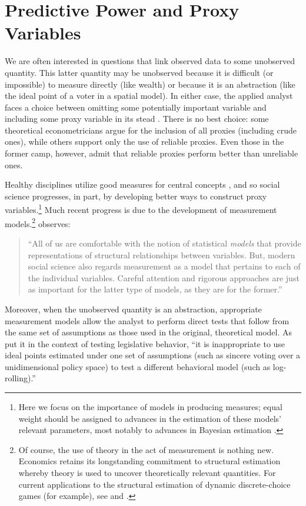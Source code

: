 \section{Predictive Power and Proxy Variables}

We are often interested in questions that link observed data to some unobserved quantity. 
This latter quantity may be unobserved because it is difficult (or impossible) to measure directly (like wealth) or because it is an abstraction (like the ideal point of a voter in a spatial model). 
In either case, the applied analyst faces a choice between omitting some potentially important variable and including some proxy variable in its stead \citep{stahlecker1993}. 
There is no best choice: some theoretical econometricians \citep[e.g.][]{mccallum1972} argue for the inclusion of all proxies (including crude ones), while others \citep[e.g.][]{maddala1977} support only the use of reliable proxies. 
Even those in the former camp, however, admit that reliable proxies perform better than unreliable ones.

Healthy disciplines utilize good measures for central concepts \citep{kuhn1977}, and so social science progresses, in part, by developing better ways to construct proxy variables.\footnote{Here we focus on the importance of models in producing measures; equal weight should be assigned to advances in the estimation of these models' relevant parameters, most notably to advances in Bayesian estimation \citep{jackman2001,martin2002,clinton2004,bafumi2005}.} 
Much recent progress is due to the development of measurement models.\footnote{Of course, the use of theory in the act of measurement is nothing new. 
  Economics retains its longstanding commitment to structural estimation whereby theory is used to uncover theoretically relevant quantities. 
  For current applications to the structural estimation of dynamic discrete-choice games (for example), see \citet{su2012} and \citet{egesdal2013}.} \citet[2]{jacoby2014} observes:
\begin{quote}
  ``All of us are comfortable with the notion of statistical \emph{models} that provide representations of structural relationships between variables.  But, modern social science also regards measurement as a model that pertains to each of the individual variables.  Careful attention and rigorous approaches are just as important for the latter type of models, as they are for the former.''
\end{quote}
Moreover, when the unobserved quantity is an abstraction, appropriate measurement models allow the analyst to perform direct tests that follow from the same set of assumptions as those used in the original, theoretical model. 
As \citet[355]{clinton2004} put it in the context of testing legislative behavior, ``it is inappropriate to use ideal points estimated under one set of assumptions (such as sincere voting over a unidimensional policy space) to test a different behavioral model (such as log-rolling).''

